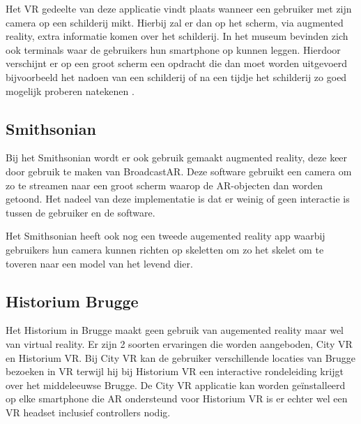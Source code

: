 Het VR gedeelte van deze applicatie vindt plaats wanneer een gebruiker met zijn camera op een schilderij mikt. Hierbij zal er dan op het scherm, via augmented reality, extra informatie komen over het schilderij.
In het museum bevinden zich ook terminals waar de gebruikers hun smartphone op kunnen leggen. Hierdoor verschijnt er op een groot scherm een opdracht die dan moet worden uitgevoerd bijvoorbeeld het nadoen van een schilderij of na een tijdje het schilderij zo goed mogelijk proberen natekenen \autocite{Ding2017}.

\subsection{Smithsonian}
Bij het Smithsonian wordt er ook gebruik gemaakt augmented reality, deze keer door gebruik te maken van BroadcastAR. Deze software gebruikt een camera om zo te streamen naar een groot scherm waarop de AR-objecten dan worden getoond. Het nadeel van deze implementatie is dat er weinig of geen interactie is tussen de gebruiker en de software. 

Het Smithsonian heeft ook nog een tweede augemented reality app waarbij gebruikers hun camera kunnen richten op skeletten om zo het skelet om te toveren naar een model van het levend dier.

\subsection{Historium Brugge}
Het Historium in Brugge maakt geen gebruik van augemented reality maar wel van virtual reality. Er zijn 2 soorten ervaringen die worden aangeboden, City VR en Historium VR. Bij City VR kan de gebruiker verschillende locaties van Brugge bezoeken in VR terwijl hij bij Historium VR een interactive rondeleiding krijgt over het middeleeuwse Brugge. De City VR applicatie kan worden geïnstalleerd op elke smartphone die AR ondersteund voor Historium VR is er echter wel een VR headset inclusief controllers nodig. 

